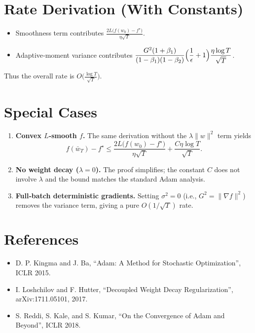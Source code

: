 \documentclass{article}
\begin{document}
\section*{Rate Derivation (With Constants)}
\begin{itemize}
    \item Smoothness term contributes $\displaystyle\frac{2L\big(f(w_0)-f^\star\big)}{\eta\sqrt{T}}$.
    \item Adaptive‑moment variance contributes $\displaystyle\frac{G^2(1+\beta_1)}{(1-\beta_1)(1-\beta_2)}\Bigl(\frac{1}{\epsilon}+1\Bigr)\frac{\eta\log T}{\sqrt{T}}$.
\end{itemize}
Thus the overall rate is $O\!\big(\frac{\log T}{\sqrt{T}}\big)$.

\section*{Special Cases}
\begin{enumerate}
    \item \textbf{Convex $L$‑smooth $f$.} The same derivation without the $\lambda\|w\|^2$ term yields
    \[
    f(\bar w_T)-f^\star\le \frac{2L\big(f(w_0)-f^\star\big)}{\eta\sqrt{T}}+\frac{C\eta\log T}{\sqrt{T}}.
    \]
    \item \textbf{No weight decay ($\lambda=0$).} The proof simplifies; the constant $C$ does not involve $\lambda$ and the bound matches the standard Adam analysis.
    \item \textbf{Full‑batch deterministic gradients.} Setting $\sigma^2=0$ (i.e., $G^2=\|\nabla f\|^2$) removes the variance term, giving a pure $O(1/\sqrt{T})$ rate.
\end{enumerate}

\section*{References}
\begin{itemize}
    \item D. P. Kingma and J. Ba, “Adam: A Method for Stochastic Optimization”, ICLR 2015.
    \item I. Loshchilov and F. Hutter, “Decoupled Weight Decay Regularization”, arXiv:1711.05101, 2017.
    \item S. Reddi, S. Kale, and S. Kumar, “On the Convergence of Adam and Beyond”, ICLR 2018.
\end{itemize}
\end{document}
